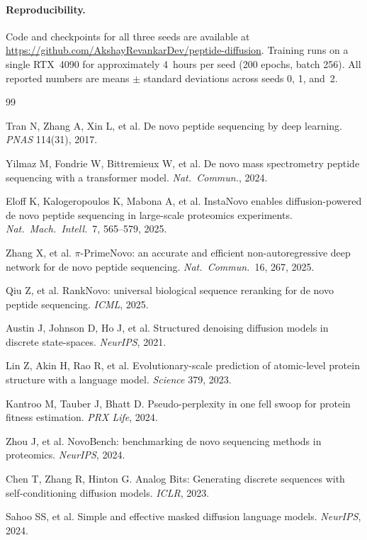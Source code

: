\documentclass[11pt]{article}
\begin{document}
\paragraph{Reproducibility.}
Code and checkpoints for all three seeds are available at
\url{https://github.com/AkshayRevankarDev/peptide-diffusion}. Training runs on a
single RTX~4090 for approximately 4~hours per seed (200 epochs, batch 256).
All reported numbers are means $\pm$ standard deviations across seeds 0, 1, and~2.


\begin{thebibliography}{99}
\small

 Tran N, Zhang A, Xin L, et al. De novo peptide sequencing by deep learning. \textit{PNAS} 114(31), 2017.

 Yilmaz M, Fondrie W, Bittremieux W, et al. De novo mass spectrometry peptide sequencing with a transformer model. \textit{Nat.~Commun.}, 2024.

 Eloff K, Kalogeropoulos K, Mabona A, et al. InstaNovo enables diffusion-powered de novo peptide sequencing in large-scale proteomics experiments. \textit{Nat.~Mach.~Intell.}~7, 565--579, 2025.

 Zhang X, et al. $\pi$-PrimeNovo: an accurate and efficient non-autoregressive deep network for de novo peptide sequencing. \textit{Nat.~Commun.}~16, 267, 2025.

 Qiu Z, et al. RankNovo: universal biological sequence reranking for de novo peptide sequencing. \textit{ICML}, 2025.

 Austin J, Johnson D, Ho J, et al. Structured denoising diffusion models in discrete state-spaces. \textit{NeurIPS}, 2021.

 Lin Z, Akin H, Rao R, et al. Evolutionary-scale prediction of atomic-level protein structure with a language model. \textit{Science} 379, 2023.

 Kantroo M, Tauber J, Bhatt D. Pseudo-perplexity in one fell swoop for protein fitness estimation. \textit{PRX Life}, 2024.

 Zhou J, et al. NovoBench: benchmarking de novo sequencing methods in proteomics. \textit{NeurIPS}, 2024.

 Chen T, Zhang R, Hinton G. Analog Bits: Generating discrete sequences with self-conditioning diffusion models. \textit{ICLR}, 2023.

 Sahoo SS, et al. Simple and effective masked diffusion language models. \textit{NeurIPS}, 2024.

\end{thebibliography}
\end{document}

